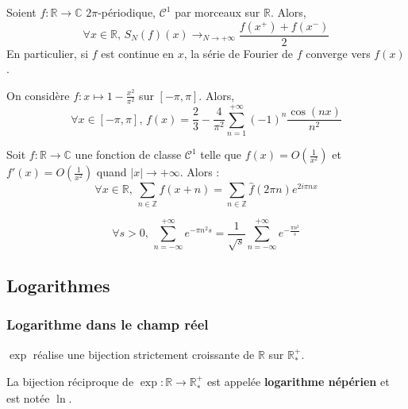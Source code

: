 	\begin{corollary}
		Soient $f : \mathbb{R} \rightarrow \mathbb{C}$ $2\pi$-périodique, $\mathcal{C}^1$ par morceaux sur $\mathbb{R}$. Alors,
		\[ \forall x \in \mathbb{R}, \, S_N(f)(x) \longrightarrow_{N \rightarrow +\infty} \frac{f(x^+) + f(x^-)}{2} \]
		En particulier, si $f$ est continue en $x$, la série de Fourier de $f$ converge vers $f(x)$.
	\end{corollary}

	\begin{example}
		On considère $f : x \mapsto 1 - \frac{x^2}{\pi^2}$ sur $[-\pi, \pi]$. Alors,
		\[ \forall x \in [-\pi, \pi], \, f(x) = \frac{2}{3} - \frac{4}{\pi^2} \sum_{n=1}^{+\infty} (-1)^n \frac{\cos(nx)}{n^2} \]
	\end{example}


	\begin{theorem}
		Soit $f : \mathbb{R} \rightarrow \mathbb{C}$ une fonction de classe $\mathcal{C}^1$ telle que $f(x) = O \left( \frac{1}{x^2} \right)$ et $f'(x) = O \left( \frac{1}{x^2} \right)$ quand $|x| \longrightarrow +\infty$. Alors :
		\[ \forall x \in \mathbb{R}, \, \sum_{n \in \mathbb{Z}} f(x+n) = \sum_{n \in \mathbb{Z}} \widehat{f}(2 \pi n) e^{2 i \pi n x} \]
	\end{theorem}

	\begin{application}
		\[ \forall s > 0, \, \sum_{n=-\infty}^{+\infty} e^{-\pi n^2 s} = \frac{1}{\sqrt{s}} \sum_{n=-\infty}^{+\infty} e^{-\frac{\pi n^2}{s}} \]
	\end{application}

	\subsection{Logarithmes}

	\subsubsection{Logarithme dans le champ réel}


	\begin{proposition}
		$\exp$ réalise une bijection strictement croissante de $\mathbb{R}$ sur $\mathbb{R}_*^+$.
	\end{proposition}

	\begin{definition}
		La bijection réciproque de $\exp : \mathbb{R} \rightarrow \mathbb{R}_*^+$ est appelée \textbf{logarithme népérien} et est notée $\ln$.
	\end{definition}

